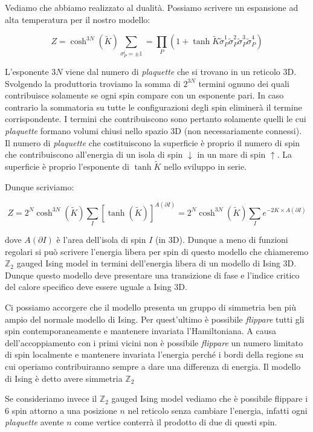 \documentclass[12pt,a4paper]{article}
\begin{document}
Vediamo che abbiamo realizzato al dualità. Possiamo scrivere un espansione ad alta temperatura per il nostro modello:

\begin{equation}
Z = \cosh^{3N} ( \tilde{K} )  \sum_{ {\sigma_P^i = \pm 1}} = \prod_{P} \left( 1 + \tanh \tilde{K} \tilde{\sigma}_P^1 \tilde{\sigma}_P^2 \tilde{\sigma}_P^3 \tilde{\sigma}_P^4 \right)
\end{equation}

L'esponente $3N$ viene dal numero di \emph{plaquette} che si trovano in un reticolo 3D. Svolgendo la produttoria troviamo la somma di $2^{3N}$ termini ognuno dei quali contribuisce solamente se ogni spin compare con un esponente pari. In caso contrario la sommatoria su tutte le configurazioni degli spin eliminerà il termine corrispondente. 
I termini che contribuiscono sono pertanto solamente quelli le cui \emph{plaquette} formano volumi chiusi nello spazio 3D (non necessariamente connessi). Il numero di \emph{plaquette} che costituiscono la superficie è proprio il numero di spin che contribuiscono all'energia di un isola di spin $\downarrow$ in un mare di spin $\uparrow$. La superficie è proprio l'esponente di $\tanh \tilde{K}$ nello sviluppo in serie. 

Dunque scriviamo:


\[
Z = 2^N \cosh^{3N} ( \tilde{K} ) \sum_{I} \left[ \tanh(\tilde{K}) \right] ^ {A(\partial I)} =  2^N \cosh^{3N} ( \tilde{K} ) \sum_{I} e^{-2 K \times A(\partial I)}
\]

dove $A(\partial I)$ è l'area dell'isola di spin $I$ (in 3D). Dunque a meno di funzioni regolari si può scrivere l'energia libera per spin di questo modello che chiameremo $\mathbb{Z}_2$ gauged Ising model in termini dell'energia libera di un modello di Ising 3D. Dunque questo modello deve presentare una transizione di fase e l'indice critico del calore specifico deve essere uguale a Ising 3D.

Ci possiamo accorgere che il modello presenta un gruppo di simmetria ben più ampio del normale modello di Ising. Per quest'ultimo è possibile \emph{flippare} tutti gli spin contemporaneamente e mantenere invariata l'Hamiltoniana. A causa dell'accoppiamento con i primi vicini non è possibile \emph{flippare} un numero limitato di spin localmente e mantenere invariata l'energia perché i bordi della regione su cui operiamo contribuiranno sempre a dare una differenza di energia. Il modello di Ising è detto avere simmetria $\mathbb{Z}_2$

Se consideriamo invece il $\mathbb{Z}_2$ gauged Ising model vediamo che è possibile flippare i 6 spin attorno a una posizione $n$ nel reticolo senza cambiare l'energia, infatti ogni \emph{plaquette} avente $n$ come vertice conterrà il prodotto di due di questi spin. 
\end{document}
